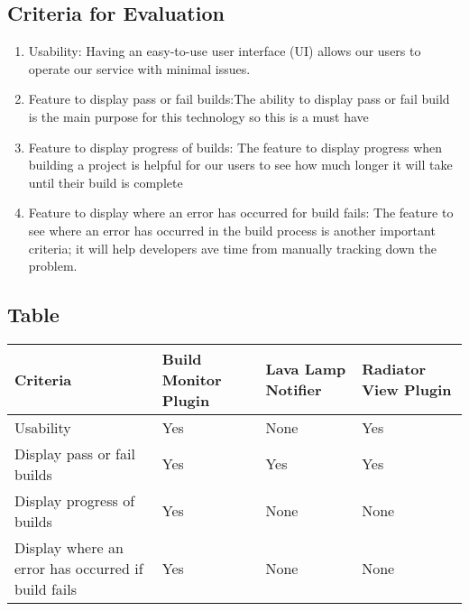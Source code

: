 \documentclass[10pt,letterpaper,onecolumn,journal]{IEEEtran}
\begin{document}
\subsection{Criteria for Evaluation}
\begin{enumerate}
  \item Usability: Having an easy-to-use user interface (UI) allows our users to operate our service with minimal issues.
  \item Feature to display pass or fail builds:The ability to display pass or fail build is  the main purpose for this technology so this is a must have
  \item Feature to display progress of builds: The feature to display progress when building a project is helpful for our users to see how much longer it will take until their build is complete
  \item Feature to display where an error has occurred for build fails: The feature to see where an error has occurred in the build process is another important criteria; it will help developers ave time from manually tracking down the problem.
\end{enumerate}
\subsection{Table}
\begin{center}
  \begin{tabular}{llll}
    Criteria & Build Monitor Plugin & Lava Lamp Notifier & Radiator View Plugin \\ \midrule
    Usability       & Yes & None & Yes \\ \midrule
    Display pass or fail builds           & Yes & Yes & Yes \\ \midrule
    Display progress of builds       & Yes & None & None \\ \midrule
    Display where an error has occurred if build fails  & Yes & None & None \\ \bottomrule
  \end{tabular}
\end{center}
\end{document}
